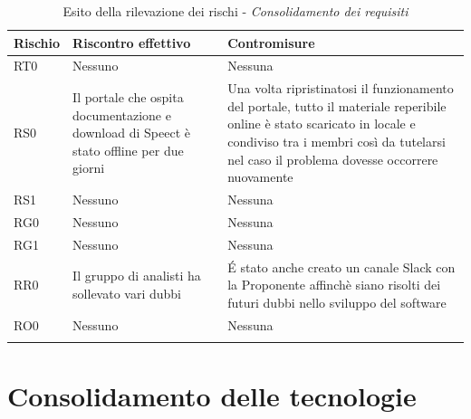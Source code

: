 \documentclass[./PianodiProgetto.tex]{subfiles}
\begin{document}
\setlength\LTleft{-5.5mm}

\begin{longtable}{|p{15mm}|p{60mm}|p{60mm}|}
	\hline \textbf{Rischio} & \textbf{Riscontro effettivo} & \textbf{Contromisure} \\
	
	\hline RT0 & Nessuno & Nessuna \\
		
	\hline RS0 & Il portale che ospita documentazione e download di Speect è stato offline per due giorni & Una volta ripristinatosi il funzionamento del portale, tutto il materiale reperibile online è stato scaricato in locale e condiviso tra i membri così da tutelarsi nel caso il problema dovesse occorrere nuovamente \\
	
	\hline RS1 & Nessuno & Nessuna \\
	
	\hline RG0 & Nessuno & Nessuna \\
	
	\hline RG1 & Nessuno & Nessuna \\
	
	\hline RR0 & Il gruppo di analisti ha sollevato vari dubbi & \'E stato anche creato un canale Slack con la Proponente affinchè siano risolti dei futuri dubbi nello sviluppo del software \\
	
	\hline RO0 & Nessuno & Nessuna \\
	
	\hline
	\caption{Esito della rilevazione dei rischi - \textit{Consolidamento dei requisiti}}
\end{longtable}

\section{Consolidamento delle tecnologie}

\setlength\LTleft{-5.5mm}
\end{document}
